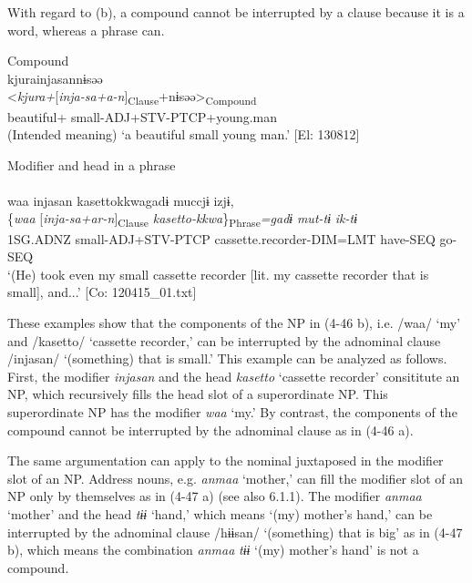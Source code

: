 With regard to (b), a compound cannot be interrupted by a clause because it is a word, whereas a phrase can.

\ea \label{ex:4.46} \ea  Compound \label{ex:4.46a}\\
\glll      *kjurainjasannɨsəə\\
      <\textit{kjura+}[\textit{inja-sa+a-n}]\textsubscript{Clause}+nɨsəə>\textsubscript{Compound}\\
      beautiful+ small-ADJ+STV-PTCP+young.man\\
    \glt       (Intended meaning) ‘a beautiful small young man.’ [El: 130812]

  \ex Modifier and head in a phrase\\\\
\glll     waa  injasan  {\textbar}kasetto{\textbar}kkwagadɨ  muccjɨ  izjɨ,  \\
      \{\textit{waa}  [\textit{inja-sa+ar-n}]\textsubscript{Clause} \textit{kasetto-kkwa}\}\textsubscript{Phrase}\textit{=gadɨ}   \textit{mut-tɨ}  \textit{ik-tɨ}  \\
      1SG.ADNZ  small-ADJ+STV-PTCP  cassette.recorder-DIM=LMT  have-SEQ  go-SEQ        \\
    \glt       ‘(He) took even my small cassette recorder [lit. my cassette recorder that is small], and...’ [Co: 120415\_01.txt]
    \z
\z

These examples show that the components of the NP in (4-46 b), i.e. /waa/ ‘my’ and /kasetto/ ‘cassette recorder,’ can be interrupted by the adnominal clause /injasan/ ‘(something) that is small.’ This example can be analyzed as follows. First, the modifier \textit{injasan} and the head \textit{kasetto} ‘cassette recorder’ consititute an NP, which recursively fills the head slot of a superordinate NP. This superordinate NP has the modifier \textit{waa} ‘my.’ By contrast, the components of the compound cannot be interrupted by the adnominal clause as in (4-46 a).

The same argumentation can apply to the nominal juxtaposed in the modifier slot of an NP. Address nouns, e.g. \textit{anmaa} ‘mother,’ can fill the modifier slot of an NP only by themselves as in (4-47 a) (see also 6.1.1). The modifier \textit{anmaa} ‘mother’ and the head \textit{tɨɨ} ‘hand,’ which means ‘(my) mother’s hand,’ can be interrupted by the adnominal clause /hɨɨsan/ ‘(something) that is big’ as in (4-47 b), which means the combination \textit{anmaa} \textit{tɨɨ} ‘(my) mother’s hand’ is not a compound.

